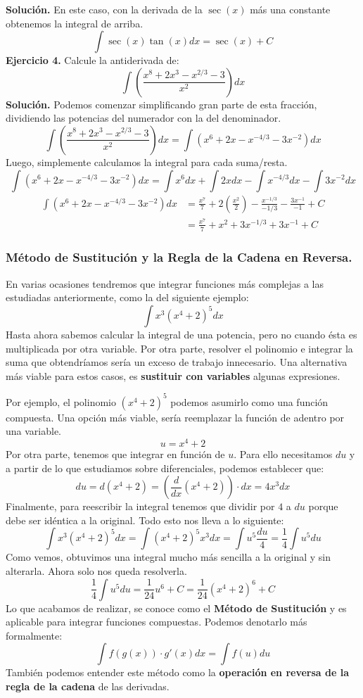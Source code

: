 \documentclass[12pt]{article}
\begin{document}
\textbf{Solución.} \quad En este caso, con la derivada de la $\sec(x)$ más una constante obtenemos la integral de arriba.
\[
  \int \sec(x) \tan(x) dx = \sec(x) + C
\]
\textbf{Ejercicio 4.} \quad Calcule la antiderivada de:
\[
  \int \left(\frac{x^{8} + 2x^{3} - x^{2/3} - 3}{x^{2}}\right) dx
\]
\textbf{Solución.} \quad Podemos comenzar simplificando gran parte de esta fracción, dividiendo las potencias del numerador con la del denominador.
\[
  \int \left(\frac{x^{8} + 2x^{3} - x^{2/3} - 3}{x^{2}}\right) dx =
  \int (x^{6} + 2x - x^{-4/3} - 3x^{-2}) dx
\]
Luego, simplemente calculamos la integral para cada suma/resta.
\[
  \int (x^{6} + 2x - x^{-4/3} - 3x^{-2}) dx = \int x^{6} dx + \int 2xdx - \int x^{-4/3}dx - \int 3x^{-2} dx
\]
\begin{align*}
  \int (x^{6} + 2x - x^{-4/3} - 3x^{-2}) dx &=
    \frac{x^{7}}{7} + 2\left(\frac{x^{2}}{2}\right) - \frac{x^{-1/3}}{-1/3} - \frac{3x^{-1}}{-1} + C \\
    &= \frac{x^{7}}{7} + x^{2} + 3x^{-1/3} + 3x^{-1} + C
\end{align*}


\subsubsection{Método de Sustitución y la Regla de la Cadena en Reversa.}

En varias ocasiones tendremos que integrar funciones más complejas a las estudiadas anteriormente, como la del siguiente ejemplo:
\[
  \int x^{3}(x^{4} + 2)^{5} dx
\]
Hasta ahora sabemos calcular la integral de una potencia, pero no cuando ésta es multiplicada por otra variable. Por otra parte, resolver el polinomio e integrar la suma que obtendríamos sería un exceso de trabajo innecesario. Una alternativa más viable para estos casos, es \textbf{sustituir con variables} algunas expresiones.

Por ejemplo, el polinomio $(x^{4} + 2)^{5}$ podemos asumirlo como una función compuesta. Una opción más viable, sería reemplazar la función de adentro por una variable.
\[
  u = x^{4} + 2
\]
Por otra parte, tenemos que integrar en función de $u$. Para ello necesitamos $du$ y a partir de lo que estudiamos sobre diferenciales, podemos establecer que:
\[
  du = d(x^{4} + 2) = \left(\frac{d}{dx} (x^{4} + 2)\right) \cdot dx =  4x^{3} dx
\]
Finalmente, para reescribir la integral tenemos que dividir por $4$ a $du$ porque debe ser idéntica a la original. Todo esto nos lleva a lo siguiente:
\[
  \int x^{3}(x^{4} + 2)^{5} dx = \int (x^{4} + 2)^{5} x^{3}dx
                               = \int u^{5} \frac{du}{4}
                               = \frac{1}{4} \int u^{5} du
\]
Como vemos, obtuvimos una integral mucho más sencilla a la original y sin alterarla. Ahora solo nos queda resolverla.
\[
  \frac{1}{4} \int u^{5} du = \frac{1}{24} u^{6} + C = \frac{1}{24} (x^{4} + 2)^{6} + C
\]
Lo que acabamos de realizar, se conoce como el \textbf{Método de Sustitución} y es aplicable para integrar funciones compuestas. Podemos denotarlo más formalmente:
\[
  \int f(g(x)) \cdot g'(x) dx = \int f(u) du
\]
También podemos entender este método como la \textbf{operación en reversa de la regla de la cadena} de las derivadas.
\end{document}
